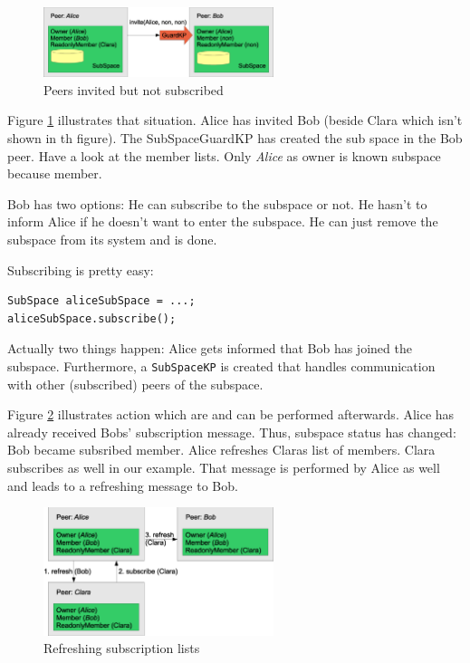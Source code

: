 \begin{figure}[t]
\centering
\includegraphics[width=0.60\textwidth]{subspaceAfterInvitation.eps}
\caption{Peers invited but not subscribed}
\label{fig:subspaceAfterInvitation}
\end{figure}

Figure \ref{fig:subspaceAfterInvitation} illustrates that situation.
Alice has invited Bob (beside Clara which isn't shown in th figure). The 
SubSpaceGuardKP has created the sub space in the Bob peer. Have a look
at the member lists. Only {\it Alice} as owner is known subspace because member.

Bob has two options: He can subscribe to the subspace or not. He hasn't to inform Alice if he doesn't want to enter the subspace. He can just remove the subspace from its system and is done.

Subscribing is pretty easy:

\begin{verbatim}
SubSpace aliceSubSpace = ...;
aliceSubSpace.subscribe();
\end{verbatim}

Actually two things happen: Alice gets informed that Bob has joined the subspace. Furthermore, a {\verb|SubSpaceKP|} is created that handles communication with other (subscribed) peers of the subspace.

Figure \ref{fig:subSpaceRefreshing} illustrates action which are and can
be performed afterwards. Alice has already received Bobs' subscription message. 
Thus, subspace status has changed: Bob became subsribed member. Alice refreshes
Claras list of members. Clara subscribes as well in our example. That message
is performed by Alice as well and leads to a refreshing message to Bob.

\begin{figure}[t]
\centering
\includegraphics[width=0.60\textwidth]{subSpaceRefreshing.eps}
\caption{Refreshing subscription lists}
\label{fig:subSpaceRefreshing}
\end{figure}

